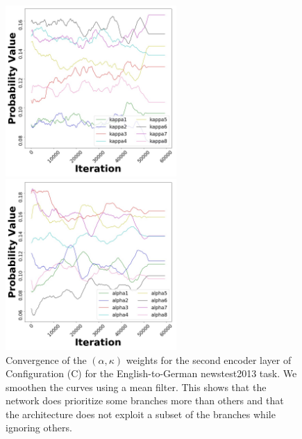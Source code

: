 \documentclass{article} %
\begin{document}
\begin{figure}

  \centering
  \parbox{6.5cm}{
    \includegraphics[width=6.5cm]{gate_real_gateInner_Enc1_1_txt.jpg}
  }
\parbox{6.5cm}{
  \includegraphics[width=6.5cm]{gate_real_gateOutput_Enc0_0_txt.jpg}
}
\caption{Convergence of the $(\alpha,\kappa)$ weights for the second encoder layer of Configuration (C) for the English-to-German newstest2013 task. We smoothen the curves using a mean filter. This shows that the network does prioritize some branches more than others and that the architecture does not exploit a subset of the branches while ignoring others.\label{fig:conv}} 
\end{figure}

\end{document}
